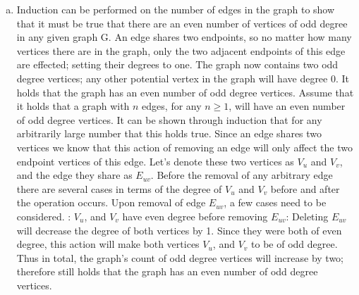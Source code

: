 \documentclass[10pt]{article}
\begin{document}
\begin{question}
\end{question} 

\begin{question}
    \begin{enumerate}[a)]
        \item %
            Induction can be performed on the number of edges in the graph to show that it must be true that there are an even number of vertices of odd degree in any given graph G.
            \newline \newline
            \newline
            An edge shares two endpoints, so no matter how many vertices there are in the graph, only the two adjacent endpoints of this edge are effected; setting their degrees to one. The graph now contains two odd degree vertices; any other potential vertex in the graph will have degree 0. It holds that the graph has an even number of odd degree vertices.
            \newline \newline
             \newline
            Assume that it holds that a graph with $n$ edges, for any $n \geq 1$, will have an even number of odd degree vertices. It can be shown through induction that for any arbitrarily large number that this holds true.
            \newline \newline
             \newline
            Since an edge shares two vertices we know that this action of removing an edge will only affect the two endpoint vertices of this edge. Let's denote these two vertices as $V_u$ and $V_v$, and the edge they share as $E_{uv}$. Before the removal of any arbitrary edge there are several cases in terms of the degree of $V_u$ and $V_v$ before and after the operation occurs.
            \newline \newline
            Upon removal of edge $E_{uv}$, a few cases need to be considered.\newline \newline
            : $V_u$, and $V_v$ have even degree before removing $E_{uv}$:\newline
            Deleting $E_{uv}$ will decrease the degree of both vertices by 1. Since they were both of even degree, this action will make both vertices $V_u$, and $V_v$ to be of odd degree. Thus in total, the graph's count of odd degree vertices will increase by two; therefore still holds that the graph has an even number of odd degree vertices.\newline 
            

\end{enumerate}
\end{question}
\end{document}
